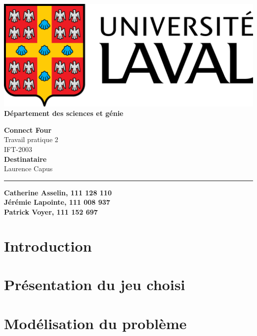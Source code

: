 \documentclass[12pt]{article}
\begin{document}
\begin{titlepage}
	\begin{minipage}{0.5\textwidth}
		\begin{flushleft}
			\includegraphics[scale=0.1]{logo.png} \\
			\textbf{Département des sciences et génie}
		\end{flushleft}
	\end{minipage}	
	\vspace{150px}
	\begin{center} \large
		\textbf{Connect Four} \\
		Travail pratique 2 \\
		IFT-2003 \\
		\vspace{150px}
		\textbf{Destinataire} \\
		Laurence Capus
	\end{center}
	\vfill
	\rule{\linewidth}{.5pt}
	\newline	
	\textbf{Catherine Asselin, 111 128 110} \\
	\textbf{Jérémie Lapointe, 111 008 937} \\
	\textbf{Patrick Voyer, 111 152 697} 
\end{titlepage}

\newpage
\setcounter{page}{1}

\section*{Introduction}
\section*{Présentation du jeu choisi}

\section*{Modélisation du problème}
\end{document}
